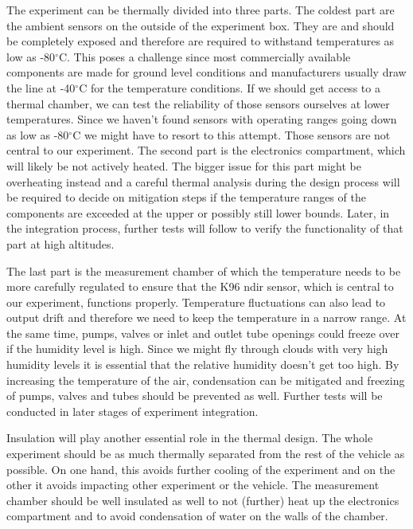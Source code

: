 \documentclass[12pt,a4paper]{report}
\newcommand{\degree}{\ensuremath{^\circ}}
\begin{document}
The experiment can be thermally divided into three parts. The coldest part are the ambient sensors on the outside of the experiment box. They are and should be completely exposed and therefore are required to withstand temperatures as low as -80\degree C. This poses a challenge since most commercially available components are made for ground level conditions and manufacturers usually draw the line at -40\degree C for the temperature conditions. If we should get access to a thermal chamber, we can test the reliability of those sensors ourselves at lower temperatures. Since we haven't found sensors with operating ranges going down as low as -80\degree C we might have to resort to this attempt. Those sensors are not central to our experiment. The second part is the electronics compartment, which will likely be not actively heated. The bigger issue for this part might be overheating instead and a careful thermal analysis during the design process will be required to decide on mitigation steps if the temperature ranges of the components are exceeded at the upper or possibly still lower bounds. Later, in the integration process, further tests will follow to verify the functionality of that part at high altitudes.

The last part is the measurement chamber of which the temperature needs to be more carefully regulated to ensure that the K96 \ac{ndir} sensor, which is central to our experiment, functions properly. Temperature fluctuations can also lead to output drift and therefore we need to keep the temperature in a narrow range. At the same time, pumps, valves or inlet and outlet tube openings could freeze over if the humidity level is high. Since we might fly through clouds with very high humidity levels it is essential that the relative humidity doesn't get too high. By increasing the temperature of the air, condensation can be mitigated and freezing of pumps, valves and tubes should be prevented as well. Further tests will be conducted in later stages of experiment integration.

Insulation will play another essential role in the thermal design. The whole experiment should be as much thermally separated from the rest of the vehicle as possible. On one hand, this avoids further cooling of the experiment and on the other it avoids impacting other experiment or the vehicle. The measurement chamber should be well insulated as well to not (further) heat up the electronics compartment and to avoid condensation of water on the walls of the chamber.
\end{document}
